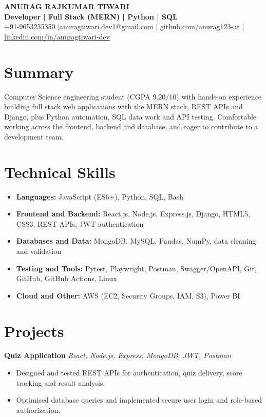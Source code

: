 \documentclass[9.5pt,a4paper]{article}
\newcommand{\project}[2]{%
  \noindent\textbf{#1} \hfill {\small\textit{#2}}\\[-1pt]
}
\begin{document}
\begin{center}
  {\Huge\bfseries\color{navy} ANURAG RAJKUMAR TIWARI}\\[3pt]
  {\large\bfseries Developer | Full Stack (MERN) | Python | SQL}\\[4pt]
  {\small +91-9653235350 \quad|\quad anuragtiwari.dev1@gmail.com \quad|\quad
  \href{https://github.com/anurag123-at}{github.com/anurag123-at} \quad|\quad
  \href{https://linkedin.com/in/anuragtiwari-dev}{linkedin.com/in/anuragtiwari-dev}}
\end{center}

\section*{Summary}
Computer Science engineering student (CGPA 9.20/10) with hands-on experience building full stack web applications with the MERN stack, REST APIs and Django, plus Python automation, SQL data work and API testing. Comfortable working across the frontend, backend and database, and eager to contribute to a development team.

\section*{Technical Skills}
\begin{itemize}
  \item \textbf{Languages:} JavaScript (ES6+), Python, SQL, Bash
  \item \textbf{Frontend and Backend:} React.js, Node.js, Express.js, Django, HTML5, CSS3, REST APIs, JWT authentication
  \item \textbf{Databases and Data:} MongoDB, MySQL, Pandas, NumPy, data cleaning and validation
  \item \textbf{Testing and Tools:} Pytest, Playwright, Postman, Swagger/OpenAPI, Git, GitHub, GitHub Actions, Linux
  \item \textbf{Cloud and Other:} AWS (EC2, Security Groups, IAM, S3), Power BI
\end{itemize}

\section*{Projects}
\project{Quiz Application}{React, Node.js, Express, MongoDB, JWT, Postman}
\begin{itemize}
  \item Designed and tested REST APIs for authentication, quiz delivery, score tracking and result analysis.
  \item Optimised database queries and implemented secure user login and role-based authorization.
\end{itemize}
\end{document}
